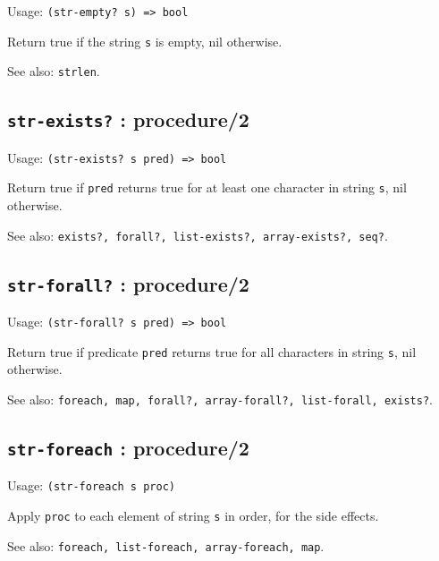 \documentclass[
]{article}
\newcommand{\passthrough}[1]{#1}
\begin{document}
Usage: \passthrough{\lstinline!(str-empty? s) => bool!}

Return true if the string \passthrough{\lstinline!s!} is empty, nil
otherwise.

See also: \passthrough{\lstinline!strlen!}.

\hypertarget{str-exists-procedure2-1}{%
\subsection{\texorpdfstring{\texttt{str-exists?} :
procedure/2}{str-exists? : procedure/2}}\label{str-exists-procedure2-1}}

Usage: \passthrough{\lstinline!(str-exists? s pred) => bool!}

Return true if \passthrough{\lstinline!pred!} returns true for at least
one character in string \passthrough{\lstinline!s!}, nil otherwise.

See also:
\passthrough{\lstinline!exists?, forall?, list-exists?, array-exists?, seq?!}.

\hypertarget{str-forall-procedure2-1}{%
\subsection{\texorpdfstring{\texttt{str-forall?} :
procedure/2}{str-forall? : procedure/2}}\label{str-forall-procedure2-1}}

Usage: \passthrough{\lstinline!(str-forall? s pred) => bool!}

Return true if predicate \passthrough{\lstinline!pred!} returns true for
all characters in string \passthrough{\lstinline!s!}, nil otherwise.

See also:
\passthrough{\lstinline!foreach, map, forall?, array-forall?, list-forall, exists?!}.

\hypertarget{str-foreach-procedure2-1}{%
\subsection{\texorpdfstring{\texttt{str-foreach} :
procedure/2}{str-foreach : procedure/2}}\label{str-foreach-procedure2-1}}

Usage: \passthrough{\lstinline!(str-foreach s proc)!}

Apply \passthrough{\lstinline!proc!} to each element of string
\passthrough{\lstinline!s!} in order, for the side effects.

See also:
\passthrough{\lstinline!foreach, list-foreach, array-foreach, map!}.
\end{document}
